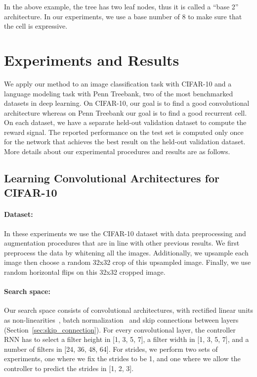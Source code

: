 \documentclass{article} \usepackage{iclr2017_conference,times}
\begin{document}
In the above example, the tree has two leaf nodes, thus it is called a ``base 2'' architecture. In our experiments, we use a base number of 8 to make sure that the cell is expressive. 














\section{Experiments and Results}
\label{others}

We apply our method to an image classification task with CIFAR-10 and a language modeling task with Penn Treebank, two of the most benchmarked datasets in deep learning. On CIFAR-10, our goal is to find a good convolutional architecture whereas on Penn Treebank our goal is to find a good recurrent cell. On each dataset, we have a separate held-out validation dataset to compute the reward signal. The reported performance on the test set is computed only once for the network that achieves the  best result on the held-out validation dataset. More details about our experimental procedures and results are as follows.




\subsection{Learning Convolutional Architectures for CIFAR-10}

\paragraph{Dataset:} In these experiments we use the CIFAR-10 dataset with data preprocessing and augmentation procedures that are in line with other previous results. We first preprocess the data by whitening all the images. Additionally, we upsample each image then choose a random 32x32 crop of this upsampled image. Finally, we use random horizontal flips on this 32x32 cropped image.


\paragraph{Search space:} Our search space consists of convolutional architectures, with rectified linear units as non-linearities~\citep{nair2010rectified}, batch normalization~\citep{BatchNorm} and skip connections between layers (Section~\ref{sec:skip_connection}). For every convolutional layer, the controller RNN has to select a filter height in [1, 3, 5, 7], a filter width in [1, 3, 5, 7], and a number of filters in [24, 36, 48, 64].
For strides, we perform two sets of experiments, one where we fix the strides to be 1, and one where we allow the controller to predict the strides in [1, 2, 3]. 
\end{document}
